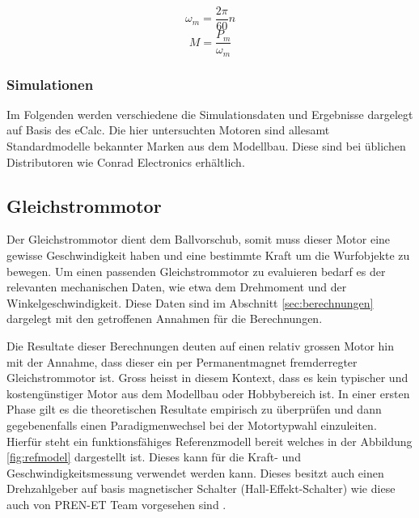 \[ \omega_m = \frac{2\pi}{60} n \]
\[ M = \frac{P_m}{\omega_m} \]

\subsubsection{Simulationen}
Im Folgenden werden verschiedene die Simulationsdaten und Ergebnisse
dargelegt auf Basis des eCalc. Die hier untersuchten Motoren sind
allesamt Standardmodelle bekannter Marken aus dem Modellbau. Diese
sind bei üblichen Distributoren wie Conrad Electronics erhältlich.

\newpage


\newpage


\newpage


\newpage

\newpage

\subsection{Gleichstrommotor}
Der Gleichstrommotor dient dem Ballvorschub, somit muss dieser Motor
eine gewisse Geschwindigkeit haben und eine bestimmte Kraft um die
Wurfobjekte zu bewegen. Um einen passenden Gleichstrommotor zu evaluieren
bedarf es der relevanten mechanischen Daten, wie etwa dem Drehmoment und
der Winkelgeschwindigkeit. Diese Daten sind im Abschnitt
\ref{sec:berechnungen} dargelegt mit den getroffenen Annahmen für die
Berechnungen.

Die Resultate dieser Berechnungen deuten auf einen relativ grossen Motor
hin mit der Annahme, dass dieser ein per Permanentmagnet fremderregter
Gleichstrommotor ist. Gross heisst in diesem Kontext, dass es kein
typischer und kostengünstiger Motor aus dem Modellbau oder Hobbybereich
ist. In einer ersten Phase gilt es die theoretischen Resultate empirisch zu
überprüfen und dann gegebenenfalls einen Paradigmenwechsel bei der
Motortypwahl einzuleiten. Hierfür steht ein funktionsfähiges
Referenzmodell bereit welches in der Abbildung \ref{fig:refmodel}
dargestellt ist. Dieses kann für die Kraft- und Geschwindigkeitsmessung
verwendet werden kann. Dieses besitzt auch einen Drehzahlgeber auf basis
magnetischer Schalter (Hall-Effekt-Schalter) wie diese auch von PREN-ET Team
vorgesehen sind \cite{pren-et-doc}.

